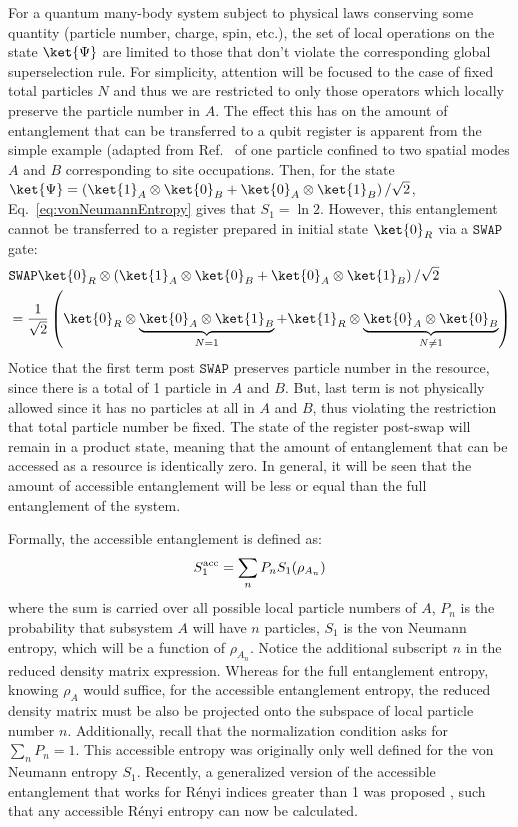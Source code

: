 	For a quantum many-body system subject to physical laws conserving some quantity (particle number, charge, spin, etc.), the set of local operations on the state $\ket{\Psi}$ are limited to those that don't violate the corresponding global superselection rule.  For simplicity, attention will be focused to the case of fixed total particles $N$ and thus we are restricted to only those operators which locally preserve the particle number in $A$.  The effect this has on the amount of entanglement that can be transferred to a qubit register is apparent from the simple example (adapted from Ref.~\cite{Wiseman:2003jx} of one particle confined to two spatial modes $A$ and $B$ corresponding to site occupations.  Then, for the state $\ket{\Psi} = \left(\ket{1}_A \otimes \ket{0}_{B} + \ket{0}_A \otimes \ket{1}_{B} \right)/\sqrt{2}$, Eq.~\eqref{eq:vonNeumannEntropy} gives that $S_1 = \ln 2$. However, this entanglement cannot be transferred to a register prepared in initial state $\ket{0}_R$ via a $\texttt{SWAP}$ gate:
\begin{align*}
    & \texttt{SWAP} \ket{0}_R\otimes\left(\ket{1}_A \otimes
    \ket{0}_{B} + \ket{0}_A \otimes \ket{1}_{B} \right)/\sqrt{2} \\
    &= \frac{1}{\sqrt{2}}\left( \ket{0}_R \otimes \underbrace{\ket{0}_A \otimes
        \ket{1}_{B}}_{N=1} + \ket{1}_R \otimes \underbrace{\ket{0}_A \otimes
    \ket{0}_{B}}_{N\neq1} \right)
\end{align*}
Notice that the first term post $\texttt{SWAP}$ preserves particle number in the resource, since there is a total of 1 particle in $A$ and $B$. But, last term is not physically allowed since it has no particles at all in $A$ and $B$, thus violating the restriction that total particle number be fixed. The state of the register post-swap will remain in a product state, meaning that the amount of entanglement that can be accessed as a resource is identically zero. In general, it will be seen that the amount of accessible entanglement will be less or equal than the full entanglement of the system.

Formally, the accessible entanglement is defined as:
%
\begin{equation}
\label{eq:accS1}
S_1^{\rm acc} = \sum_n P_n S_1(\rho_{A_{n}})
\end{equation}
%
where the sum is carried over all possible local particle numbers of $A$, $P_n$ is the probability that subsystem $A$ will have $n$ particles, $S_1$ is the von Neumann entropy, which will be a function of $\rho_{A_{n}}$. Notice the additional subscript $n$ in the reduced density matrix expression. Whereas for the full entanglement entropy, knowing $\rho_A$ would suffice, for the accessible entanglement entropy, the reduced density matrix must be also be projected onto the subspace of local particle number $n$. Additionally, recall that the normalization condition asks for $\sum_n P_n = 1$. This accessible entropy was originally only well defined for the von Neumann entropy $S_1$. Recently, a generalized version of the accessible entanglement that works for R\'enyi indices greater than 1 was proposed \cite{Barghathi:2018oe}, such that any accessible R\'enyi entropy can now be calculated.

